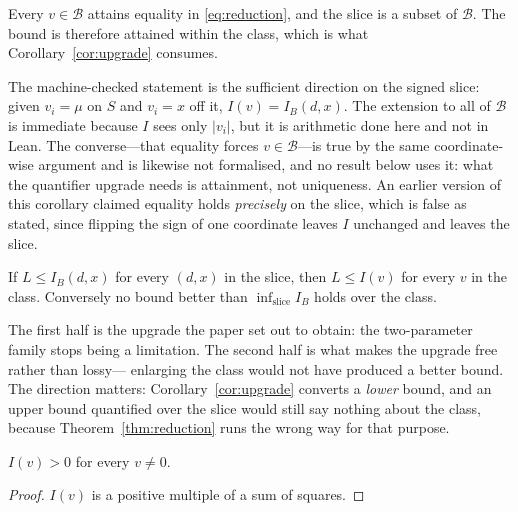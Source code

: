 \begin{corollary}
\label{cor:tight}
Every $v\in\mathcal{B}$ attains equality in \eqref{eq:reduction}, and the slice is a subset
of $\mathcal{B}$. The bound is therefore attained within the class, which is what
Corollary~\ref{cor:upgrade} consumes.
\end{corollary}


The machine-checked statement is the sufficient direction on the signed slice: given
$v_{i}=\mu$ on $S$ and $v_{i}=x$ off it, $I(v)=I_{B}(d,x)$. The extension to all of
$\mathcal{B}$ is immediate because $I$ sees only $|v_{i}|$, but it is arithmetic done here
and not in Lean. The converse---that equality forces $v\in\mathcal{B}$---is true by the same
coordinate-wise argument and is likewise not formalised, and no result below uses it: what
the quantifier upgrade needs is attainment, not uniqueness. An earlier version of this
corollary claimed equality holds \emph{precisely} on the slice, which is false as stated,
since flipping the sign of one coordinate leaves $I$ unchanged and leaves the slice.

\begin{corollary}
\label{cor:upgrade}
If $L\le I_{B}(d,x)$ for every $(d,x)$ in the slice, then $L\le I(v)$ for every $v$ in the
class. Conversely no bound better than $\inf_{\text{slice}}I_{B}$ holds over the class.
\end{corollary}

The first half is the upgrade the paper set out to obtain: the two-parameter family stops
being a limitation. The second half is what makes the upgrade free rather than lossy---
enlarging the class would not have produced a better bound. The direction matters:
Corollary~\ref{cor:upgrade} converts a \emph{lower} bound, and an upper bound quantified over
the slice would still say nothing about the class, because Theorem~\ref{thm:reduction} runs
the wrong way for that purpose.

\begin{theorem}
\label{thm:nonblind}
$I(v)>0$ for every $v\neq0$.
\end{theorem}

\begin{proof}
$I(v)$ is a positive multiple of a sum of squares.
\end{proof}


